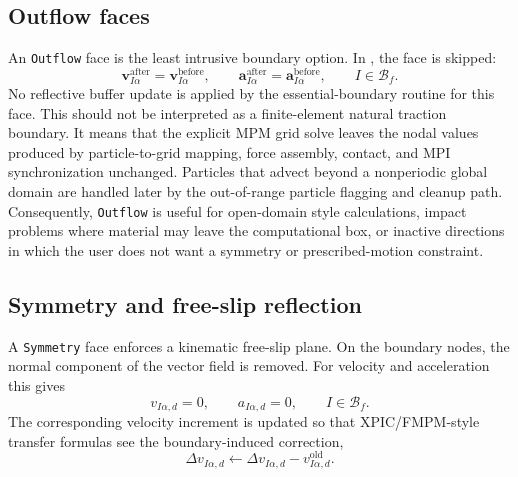 \subsection{Outflow faces}
\label{subsec:bc-outflow}

An \texttt{Outflow} face is the least intrusive boundary option.  In , the face is skipped:
\begin{equation}
  \mathbf{v}_{I\alpha}^{\mathrm{after}}=\mathbf{v}_{I\alpha}^{\mathrm{before}},
  \qquad
  \mathbf{a}_{I\alpha}^{\mathrm{after}}=\mathbf{a}_{I\alpha}^{\mathrm{before}},
  \qquad I\in\mathcal{B}_f.
\end{equation}
No reflective buffer update is applied by the essential-boundary routine for this face.  This should not be interpreted as a finite-element natural traction boundary.  It means that the explicit MPM grid solve leaves the nodal values produced by particle-to-grid mapping, force assembly, contact, and MPI synchronization unchanged.  Particles that advect beyond a nonperiodic global domain are handled later by the out-of-range particle flagging and cleanup path.  Consequently, \texttt{Outflow} is useful for open-domain style calculations, impact problems where material may leave the computational box, or inactive directions in which the user does not want a symmetry or prescribed-motion constraint.

\subsection{Symmetry and free-slip reflection}
\label{subsec:bc-symmetry}

A \texttt{Symmetry} face enforces a kinematic free-slip plane.  On the boundary nodes, the normal component of the vector field is removed.  For velocity and acceleration this gives
\begin{equation}
  v_{I\alpha,d}=0,
  \qquad
  a_{I\alpha,d}=0,
  \qquad I\in\mathcal{B}_f.
  \label{eq:bc-symmetry-boundary-node}
\end{equation}
The corresponding velocity increment is updated so that XPIC/FMPM-style transfer formulas see the boundary-induced correction,
\begin{equation}
  \Delta v_{I\alpha,d} \leftarrow \Delta v_{I\alpha,d} - v_{I\alpha,d}^{\mathrm{old}}.
\end{equation}

